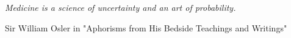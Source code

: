 \chapter*{}

\emph{
Medicine is a science of uncertainty and an art of probability. 
}

Sir William Osler in "Aphorisms from His Bedside Teachings and Writings"

